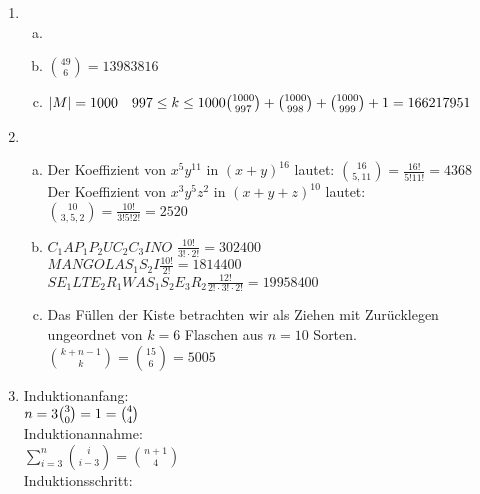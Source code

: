 \documentclass[a4paper]{scrartcl}
\title{\titleinfo}
\author{Elena Noll, Sven-Hendrik Haase, Arne Feil}
\date{\today}
\begin{document}
\maketitle
\begin{enumerate}[1.]
\item
\begin{enumerate}[a)]
\item
\item
${49 \choose 6}=13 983 816$
\item
$|M|=1000 \quad  997 \leq k \leq 1000 \\
{1000 \choose 997}+{1000 \choose 998}+{1000 \choose 999}+1=166 217 951$
\end{enumerate}
\item
\begin{enumerate}[a)]
\item
Der Koeffizient von $x^5y^{11}$ in $(x+y)^{16}$ lautet: ${16 \choose 5,11}= 
\frac{16!}{5!11!}=4368$ \\
Der Koeffizient von $x^3y^5z^2$ in $(x+y+z)^{10}$ lautet: ${10 \choose 3,5,2}= 
\frac{10!}{3!5!2!}=2520$
\item
$C_1 A P_1 P_2 U C_2 C_3 I N O$
$\frac{10!}{3!\cdot 2!}=302400$\\
$MANGOLAS_1S_2I
\frac{10!}{2!}=1 814 400$\\
$SE_1LTE_2R_1WAS_1S_2E_3R_2
\frac{12!}{2!\cdot 3!\cdot 2!}=19 958 400$
\item
Das Füllen der Kiste betrachten wir als Ziehen mit Zurücklegen ungeordnet von 
$k=6$ Flaschen aus $n=10$ Sorten.\\
${k+n-1 \choose k}={15 \choose 6}=5005$
\end{enumerate}
\item
Induktionanfang:\\
$n=3\\
{3 \choose 0}=1={4 \choose 4}$\\
Induktionannahme:\\
$\displaystyle \sum_{i=3}^{n}{i \choose i-3}={n+1 \choose 4}$\\
Induktionsschritt:\\

\end{enumerate}
\end{document}
